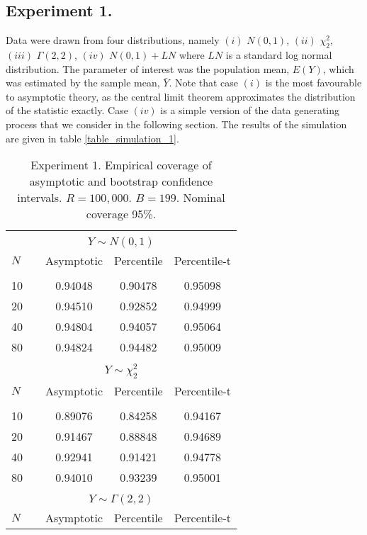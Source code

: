 \documentclass[english, 11pt,a4paper, ]{article}
\begin{document}
\subsection{Experiment 1.}
Data were drawn from four distributions, namely $(i)$ $N(0,1)$, $(ii)$  $\chi^2_2 $,  $(iii)$ $\Gamma(2,2)$, $(iv)$ $N(0,1)+ LN $ where $ LN $ is a standard log normal distribution. The parameter of interest was the population mean, $ E(Y) $, which was estimated by the sample mean, $ \bar{Y} $. Note that case $ (i) $ is the most favourable to asymptotic theory, as the central limit theorem approximates the distribution of the statistic exactly. Case $ (iv) $ is a simple version of the data generating process that we consider in the following section. The results of the simulation are given in table \ref{table_simulation_1}.

\begin{table}
	\caption{Experiment 1. Empirical coverage of asymptotic and bootstrap confidence intervals. $ R=100,000 $. $ B=199 $. Nominal coverage 95\%. }
	\centering
	\scriptsize
	\begin{tabular}{lcccc}
		\hline \hline
		\multicolumn{5}{c}{}\\
		\multicolumn{5}{c}{ $ Y\sim N(0,1) $ }\\
		$ N $&&Asymptotic & Percentile & Percentile-t \\
		\hline \multicolumn{5}{c}{}\\
		10 & &0.94048 &     0.90478 &0.95098\\
		20 && 0.94510 &     0.92852&0.94999\\
		40 &&0.94804  &   0.94057 &0.95064\\
		80 && 0.94824 &     0.94482&0.95009\\
		\multicolumn{5}{c}{}\\
		\multicolumn{5}{c}{$ Y\sim \chi^2_2 $ }\\
		$ N $&&Asymptotic & Percentile & Percentile-t \\
		\hline \multicolumn{5}{c}{}\\
		10 & & 0.89076 &     0.84258 &0.94167\\
		20 && 0.91467  &    0.88848&0.94689\\
		40 &&0.92941    &  0.91421 &0.94778\\
		80 && 0.94010    &  0.93239&0.95001\\
		\multicolumn{5}{c}{}\\
		\multicolumn{5}{c}{$ Y\sim \Gamma(2,2) $ }\\
		$ N $&&Asymptotic & Percentile & Percentile-t \\

\end{tabular}
\end{table}
\end{document}
